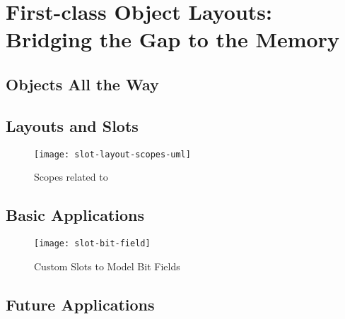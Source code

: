 \section{First-class Object Layouts: Bridging the Gap to the Memory}

\subsection{Objects All the Way}


\subsection{Layouts and Slots}

\begin{figure}[h]
	\centering
	\texttt{[image: slot-layout-scopes-uml]}
	\caption{Scopes related to }
\end{figure}

\subsection{Basic Applications}

\begin{figure}[h]
	\centering
	\texttt{[image: slot-bit-field]}
	\caption{Custom Slots to Model Bit Fields}
\end{figure}


\subsection{Future Applications}

